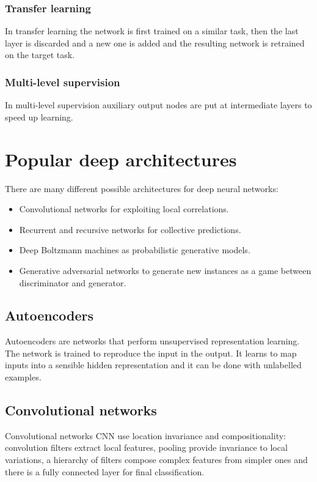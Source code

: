 		\subsubsection{Transfer learning}
		In transfer learning the network is first trained on a similar task, then the last layer is discarded and a new one is added and the resulting network is retrained on the target task.

		\subsubsection{Multi-level supervision}
		In multi-level supervision auxiliary  output nodes are put at intermediate layers to speed up learning.
	
\section{Popular deep architectures}
There are many different possible architectures for deep neural networks:

\begin{multicols}{2}
	\begin{itemize}
		\item Convolutional networks for exploiting local correlations.
		\item Recurrent and recursive networks for collective predictions.
		\item Deep Boltzmann machines as probabilistic generative models.
		\item Generative adversarial networks to generate new instances as a game between discriminator and generator.
	\end{itemize}
\end{multicols}

	\subsection{Autoencoders}
	Autoencoders are networks that perform unsupervised representation learning.
	The network is trained to reproduce the input in the output.
	It learns to map inputs into a sensible hidden representation and it can be done with unlabelled examples.

	\subsection{Convolutional networks}
	Convolutional networks CNN use location invariance and compositionality: convolution filters extract local features, pooling provide invariance to local variations, a hierarchy of filters compose complex features from simpler ones and there is a fully connected layer for final classification.


